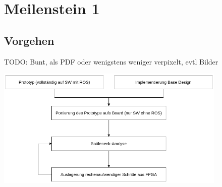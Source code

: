 \documentclass{beamer}
\begin{document}
\begin{frame}{\secname}
\begin{center}
\end{center}
\end{frame}

\section{Meilenstein 1}
\begin{frame}
\centering
\color{dark}\LARGE\textbf{\secname}
\end{frame}

\subsection{Vorgehen}
\begin{frame}{\subsecname}
TODO: Bunt, als PDF oder wenigstens weniger verpixelt, evtl Bilder
\begin{center}
\includegraphics[width=11cm]{images/vorgehen.png}
\end{center}
\end{frame}
\end{document}
